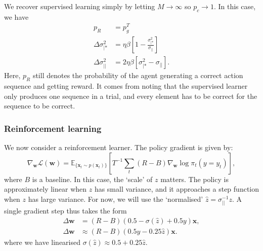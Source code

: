 \documentclass{article}
\renewcommand\b\bm
\begin{document}
We recover supervised learning simply by letting $M \rightarrow \infty$ so $p_c \rightarrow 1$.
In this case, we have
\begin{align}
    p_R &= p_g^T\\
    \Delta \sigma_{|*}^2 &= \eta \beta \left [  1 - \frac{\sigma_{|*}^2}{\sigma_{||}} \right ]\\
    \Delta \sigma_{||}^2 &= 2 \eta \beta \left [  \sigma_{|*}^2 - \sigma_{||} \right ].
\end{align}
Here, $p_R$ still denotes the probability of the agent generating a correct action sequence and getting reward.
It comes from noting that the supervised learner only produces one sequence in a trial, and every element has to be correct for the sequence to be correct.

\subsubsection*{Reinforcement learning}

We now consider a reinforcement learner.
The policy gradient is given by:
\begin{equation}
    \nabla_{\b{w}} \mathcal{L}(\b{w}) = \mathbb{E}_{ \{ \b{x}_t \sim p(\b{x}_t) \} } \left [ T^{-1} \sum_t (R - B) \nabla_{\b{w}} \log \pi_t (y = y_t) \right ],
\end{equation}
where $B$ is a baseline.
In this case, the `scale' of $z$ matters.
The policy is approximately linear when $z$ has small variance, and it approaches a step function when $z$ has large variance.
For now, we will use the `normalised' $\hat{z} = \sigma_{||}^{-1} z$.
A single gradient step thus takes the form
\begin{align}
    \Delta \b{w} &= (R - B) (0.5-\sigma(\hat{z})+0.5 y) \b{x},\\
    \Delta \b{w} &\approx (R - B) (0.5 y - 0.25 \hat{z}) \b{x}.
\end{align}
where we have linearised $\sigma(\hat{z}) \approx 0.5 + 0.25 \hat{z}$.
\end{document}
